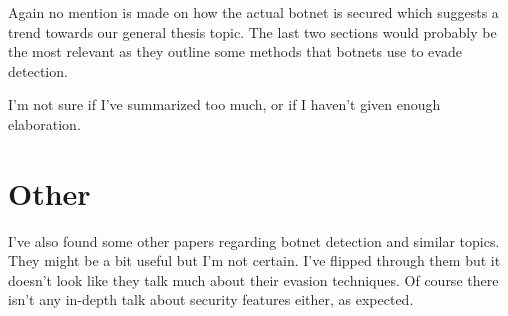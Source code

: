 \documentclass{article}
\begin{document}
	Again no mention is made on how the actual botnet is secured which suggests a trend towards our general thesis topic. The last two sections would probably be the most relevant as they outline some methods that botnets use to evade detection. 

	I'm not sure if I've summarized too much, or if I haven't given enough elaboration.

	\section*{Other}

	I've also found some other papers regarding botnet detection and similar topics. They might be a bit useful but I'm not certain. I've flipped through them but it doesn't look like they talk much about their evasion techniques. Of course there isn't any in-depth talk about security features either, as expected.
	\printbibliography
\end{document}
